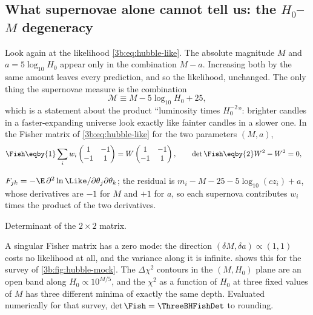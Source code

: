 \subsection{What supernovae alone cannot tell us: the \texorpdfstring{$H_0$--$M$}{H0-M} degeneracy}
\label{3b:sec:hubble-degeneracy}

Look again at the likelihood \eqref{3b:eq:hubble-like}. The absolute magnitude
$M$ and $a=5\log_{10}H_0$ appear only in the combination $M-a$. Increasing
both by the same amount leaves every prediction, and so the likelihood,
unchanged. The only thing the supernovae measure is the combination
\[
  \mathcal M\equiv M-5\log_{10}H_0+25 ,
\]
which is a statement about the product ``luminosity times $H_0^{-2}$'':
brighter candles in a faster-expanding universe look exactly like fainter
candles in a slower one. In the Fisher matrix of \eqref{3b:eq:hubble-like} for
the two parameters $(M,a)$,
\begin{align}
  \Fish
  &\eqby{1}\sum_iw_i
   \begin{pmatrix}
     1 & -1\\ -1 & 1
   \end{pmatrix}
   =W\begin{pmatrix}1&-1\\-1&1\end{pmatrix},
  \qquad
  \det\Fish\eqby{2}W^2-W^2=0 ,
  \label{3b:eq:hubble-fisher2}
\end{align}
\begin{explain}
  \item $F_{jk}=-\E\,\partial^2\ln\Like/\partial\theta_j\partial\theta_k$; the
        residual is $m_i-M-25-5\log_{10}(cz_i)+a$, whose derivatives are
        $-1$ for $M$ and $+1$ for $a$, so each supernova contributes $w_i$
        times the product of the two derivatives.
  \item Determinant of the $2\times2$ matrix.
\end{explain}
A singular Fisher matrix has a zero mode: the direction $(\delta M,\delta
a)\propto(1,1)$ costs no likelihood at all, and the variance along it is
infinite.  shows this for the survey of
\cref{3b:fig:hubble-mock}. The $\Delta\chi^2$ contours in the $(M,H_0)$ plane are an
open band along $H_0\propto10^{M/5}$, and the $\chi^2$ as a function of $H_0$ at
three fixed values of $M$ has three different minima of exactly the same
depth. Evaluated numerically for that survey, $\det\Fish=\ThreeBHFishDet$ to
rounding.


